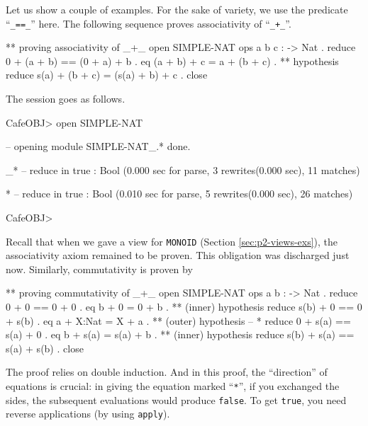 \documentclass[a4paper]{memoir}
\begin{document}
Let us show a couple of examples. For the sake of variety, we use
the predicate ``\verb|_==_|'' here. The following sequence proves
associativity of ``\verb|_+_|''.
\begin{vvtm}
\begin{ccode}
  ** proving associativity of _+_
  open SIMPLE-NAT
  ops a b c : -> Nat .
  reduce 0 + (a + b) == (0 + a) + b .
  eq (a + b) + c = a + (b + c) . ** hypothesis
  reduce s(a) + (b + c) = (s(a) + b) + c .
  close
\end{ccode}
\end{vvtm}
The session goes as follows.
\begin{vvtm}
\begin{ccode}
  CafeOBJ> open SIMPLE-NAT

  -- opening module SIMPLE-NAT_.* done.


  _*
  -- reduce in %
  true : Bool
  (0.000 sec for parse, 3 rewrites(0.000 sec), 11 matches)

  *
  -- reduce in %
  true : Bool
  (0.010 sec for parse, 5 rewrites(0.000 sec), 26 matches)


  CafeOBJ> 
\end{ccode}
\end{vvtm}
Recall that when we gave a view for \verb|MONOID|
(Section \ref{sec:p2-views-exs}), the associativity axiom
remained to be proven. This obligation was discharged just now.
Similarly, commutativity is proven by
\begin{vvtm}
\begin{ccode}
  ** proving commutativity of _+_
  open SIMPLE-NAT
  ops a b : -> Nat .
  reduce 0 + 0 == 0 + 0 .
  eq b + 0 = 0 + b . ** (inner) hypothesis
  reduce s(b) + 0 == 0 + s(b) .
  eq a + X:Nat = X + a . ** (outer) hypothesis -- *
  reduce 0 + s(a) == s(a) + 0 .
  eq b + s(a) = s(a) + b . ** (inner) hypothesis
  reduce s(b) + s(a) == s(a) + s(b) .
  close
\end{ccode}
\end{vvtm}
The proof relies on double induction. And in this proof,
the ``direction'' of equations is crucial: in giving the equation
marked ``\verb|*|'', if you exchanged the sides, the subsequent evaluations
would produce \verb|false|. To get \verb|true|, you need
reverse applications (by using \verb|apply|).
\end{document}
